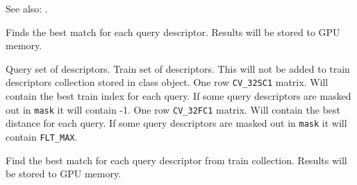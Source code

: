 See also: .


\label{cppfunc.gpu.BruteForceMatcher.matchSingle}
Finds the best match for each query descriptor. Results will be stored to GPU memory.


\begin{description}
 {Query set of descriptors.}
 {Train set of descriptors. This will not be added to train descriptors collection stored in class object.}
 {One row \texttt{CV\_32SC1} matrix. Will contain the best train index for each query. If some query descriptors are masked out in \texttt{mask} it will contain -1.}
 {One row \texttt{CV\_32FC1} matrix. Will contain the best distance for each query. If some query descriptors are masked out in \texttt{mask} it will contain \texttt{FLT\_MAX}.}
\end{description}


\label{cppfunc.gpu.BruteForceMatcher.matchCollection}
Find the best match for each query descriptor from train collection. Results will be stored to GPU memory.


